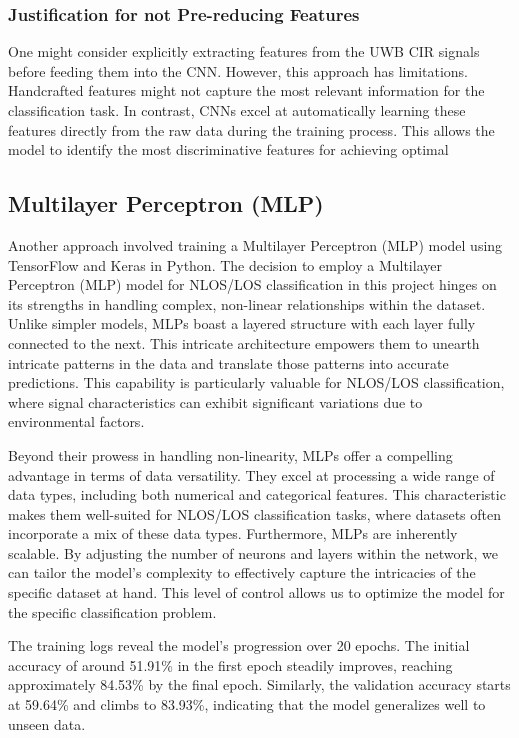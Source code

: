 \documentclass[
	article, %
	11pt, %
]{CSUniSchoolLabReport}
\begin{document}
\subsubsection{Justification for not Pre-reducing Features}

One might consider explicitly extracting features from the UWB CIR signals before feeding them into the CNN. However, this approach has limitations. Handcrafted features might not capture the most relevant information for the classification task. In contrast, CNNs excel at automatically learning these features directly from the raw data during the training process. This allows the model to identify the most discriminative features for achieving optimal


\subsection{Multilayer Perceptron (MLP)}\label{mlp}                                                                                                         
Another approach involved training a Multilayer Perceptron (MLP) model using TensorFlow and Keras in Python. The decision to employ a Multilayer Perceptron (MLP) model for NLOS/LOS classification in this project hinges on its strengths in handling complex, non-linear relationships within the dataset. Unlike simpler models, MLPs boast a layered structure with each layer fully connected to the next. This intricate architecture empowers them to unearth intricate patterns in the data and translate those patterns into accurate predictions. This capability is particularly valuable for NLOS/LOS classification, where signal characteristics can exhibit significant variations due to environmental factors.

Beyond their prowess in handling non-linearity, MLPs offer a compelling advantage in terms of data versatility. They excel at processing a wide range of data types, including both numerical and categorical features. This characteristic makes them well-suited for NLOS/LOS classification tasks, where datasets often incorporate a mix of these data types. Furthermore, MLPs are inherently scalable. By adjusting the number of neurons and layers within the network, we can tailor the model's complexity to effectively capture the intricacies of the specific dataset at hand. This level of control allows us to optimize the model for the specific classification problem.

The training logs reveal the model's progression over 20 epochs. The initial accuracy of around 51.91\% in the first epoch steadily improves, reaching approximately 84.53\% by the final epoch. Similarly, the validation accuracy starts at 59.64\% and climbs to 83.93\%, indicating that the model generalizes well to unseen data. 
\end{document}
